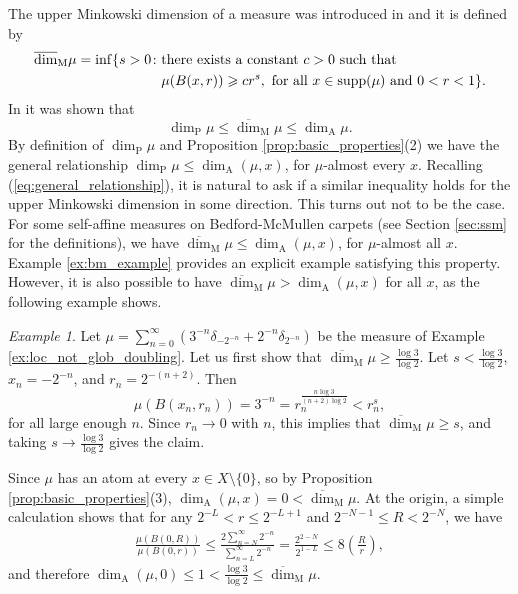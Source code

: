 \documentclass{PRM}
\newcommand{\updim}{\overline{\dim}}
\newcommand{\adim}{\dim_{\mathrm{A}}}
\theoremstyle{plain}
\theoremstyle{definition}
\theoremstyle{remark}
\newtheorem{example}[thm]{Example}
\begin{document}
The upper Minkowski dimension of a measure was introduced in \cite{KFF} and it is defined by
\begin{align*}
    \updim_{\mathrm{M}}\mu=\inf\{s>0\colon &\textnormal{there exists a constant }c>0\textnormal{ such that}\\
    &\mu(B(x,r))\geq cr^s,  \textnormal{ for all }x\in \text{supp}(\mu)\textnormal{ and }0<r<1\}.
\end{align*}
In \cite[Proposition 4.1]{KFF} it was shown that
\begin{equation}\label{eq:general_relationship}
    \dim_{\mathrm{P}}\mu\leq \updim_{\mathrm{M}}\mu\leq \dim_{\mathrm{A}}\mu.
\end{equation}
By definition of $\dim_{\mathrm{P}}\mu$ and Proposition \ref{prop:basic_properties}(2) we have the general relationship $\dim_{\mathrm{P}}\mu\leq\dim_{\mathrm{A}}(\mu,x)$, for $\mu$-almost every $x$. Recalling (\ref{eq:general_relationship}), it is natural to ask if a similar inequality holds for the upper Minkowski dimension in some direction. This turns out not to be the case. For some self-affine measures on Bedford-McMullen carpets (see Section \ref{sec:ssm} for the definitions), we have $\updim_{\mathrm{M}}\mu \leq\adim(\mu,x)$, for $\mu$-almost all $x$. Example \ref{ex:bm_example} provides an explicit example satisfying this property. However, it is also possible to have $\updim_{\mathrm{M}}\mu >\adim(\mu,x)$ for all $x$, as the following example shows.

\begin{example}
    Let $\mu=\sum_{n=0}^{\infty}(3^{-n}\delta_{-2^{-n}}+2^{-n}\delta_{2^{-n}})$ be the measure of Example \ref{ex:loc_not_glob_doubling}. Let us first show that $\updim_{\mathrm{M}}\mu\geq \frac{\log 3}{\log 2}$. Let $s<\frac{\log 3}{\log 2}$, $x_n=-2^{-n}$, and $r_n=2^{-(n+2)}$. Then
    \begin{equation*}
        \mu(B(x_n,r_n))=3^{-n}=r_n^{\frac{n\log 3}{(n+2)\log 2}}< r_n^{s},
    \end{equation*}
    for all large enough $n$. Since $r_n\to 0$ with $n$, this implies that $\updim_{\mathrm{M}}\mu\geq s$, and taking $s\to\frac{\log 3}{\log 2}$ gives the claim.
    
   Since $\mu$ has an atom at every $x\in X\setminus\{0\}$, so by Proposition \ref{prop:basic_properties}(3), $\dim_{\mathrm{A}}(\mu,x)=0<\updim_{\mathrm{M}}\mu$. At the origin, a simple calculation shows that for any $2^{-L}< r \leq 2^{-L+1}$ and $2^{-N-1}\leq R < 2^{-N}$, we have
    \begin{align*}
        \frac{\mu(B(0,R))}{\mu(B(0,r))}\leq \frac{2\sum_{n=N}^{\infty}2^{-n}}{\sum_{n=L}^{\infty}2^{-n}}=\frac{2^{2-N}}{2^{1-L}}\leq 8\left(\frac{R}{r}\right),
    \end{align*}
    and therefore $\dim_{\mathrm{A}}(\mu,0)\leq1<\frac{\log3}{\log 2}\leq \updim_{\mathrm{M}}\mu$.
\end{example}
\end{document}

